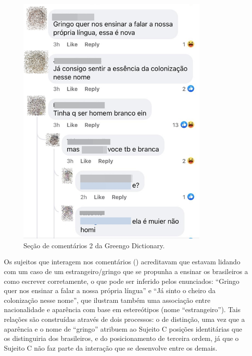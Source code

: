 \documentclass[portuguese]{textolivre}
\begin{document}
\begin{figure}[htbp]
 \centering
 \includegraphics[width=0.85\textwidth]{Fig4.png}
 \caption{Seção de comentários 2 da Greengo Dictionary.}
 \label{fig4}
\end{figure}

Os sujeitos que interagem nos comentários () acreditavam que estavam lidando com um caso de um estrangeiro/gringo que se propunha a ensinar os brasileiros a como escrever corretamente, o que pode ser inferido pelos enunciados: “Gringo quer nos ensinar a falar a nossa própria língua” e “Já sinto o cheiro da colonização nesse nome”, que ilustram também uma associação entre nacionalidade e aparência com base em estereótipos (nome “estrangeiro”). Tais relações são construídas através de dois processos: o de distinção, uma vez que a aparência e o nome de “gringo” atribuem ao Sujeito C posições identitárias que os distinguiria dos brasileiros, e do posicionamento de terceira ordem, já que o Sujeito C não faz parte da interação que se desenvolve entre os demais.  
\end{document}

